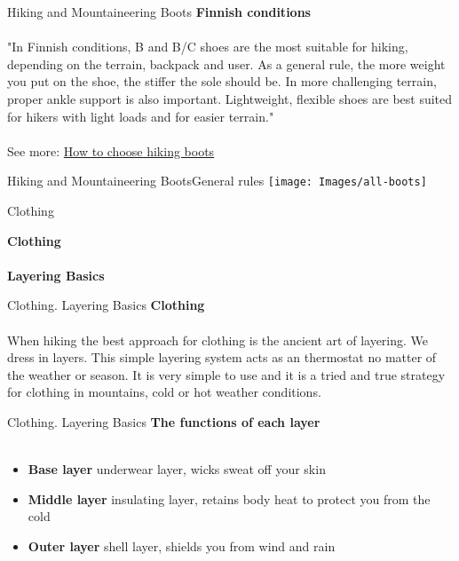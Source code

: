 \documentclass[xcolor=dvipsnames,aspectratio=1610]{beamer}
\begin{document}
\begin{frame}{Hiking and Mountaineering Boots}{}
\LARGE
\textbf{Finnish conditions}\\~\\
\Large 
"In Finnish conditions, B and B/C shoes are the most suitable for hiking, 
depending on the terrain, backpack and user. As a general rule, the more weight 
you put on the shoe, the stiffer the sole should be. In more challenging terrain, 
proper ankle support is also important. Lightweight, flexible shoes are best 
suited for hikers with light loads and for easier terrain."\\~\\

See more: \href{https://varuste.net/en/how-to-choose-hiking-boots}{How to choose
hiking boots}
\end{frame}


\begin{frame}{Hiking and Mountaineering Boots}{General rules}
\texttt{[image: Images/all-boots]}
\end{frame}


\begin{frame}{Clothing}{}
\begin{center}
\Huge \textbf{Clothing}\\~\\
\Huge \textbf{Layering Basics}
\end{center}
\end{frame}


\begin{frame}{Clothing. Layering Basics}{}
\LARGE
\textbf{Clothing}\\~\\
\Large
When hiking the best approach for clothing is the ancient art of layering.
We dress in layers. This simple layering system acts as an thermostat
no matter of the weather or season. It is very simple to use and it is a tried 
and true strategy for clothing in mountains, cold or hot weather conditions. 
\end{frame}



\begin{frame}{Clothing. Layering Basics}{}
\LARGE
\textbf{The functions of each layer}\\~\\
\Large
\begin{itemize}
    \item \textbf{Base layer} underwear layer, wicks sweat off your skin
    \item \textbf{Middle layer} insulating layer, retains body heat to protect you from the cold
    \item \textbf{Outer layer} shell layer, shields you from wind and rain\\~\\
\end{itemize}
\end{frame}
\end{document}
